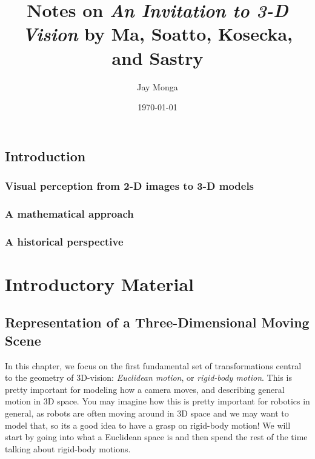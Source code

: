 \documentclass{book}
\begin{document}
\title{Notes on \textit{An Invitation to 3-D Vision} by Ma, Soatto, Kosecka, and Sastry}
\author{Jay Monga}
\date{\today}
\maketitle

\tableofcontents

\chapter{Introduction}

\section{Visual perception from 2-D images to 3-D models}

\section{A mathematical approach}

\section{A historical perspective}

\part{Introductory Material}

\chapter{Representation of a Three-Dimensional Moving Scene}

In this chapter, we focus on the first fundamental set of transformations central to the geometry of 3D-vision: \textit{Euclidean motion}, or \textit{rigid-body motion}.
This is pretty important for modeling how a camera moves, and describing general motion in 3D space.
You may imagine how this is pretty important for robotics in general, as robots are often moving around in 3D space and we may want to model that, so its a good idea to have a grasp on rigid-body motion!
We will start by going into what a Euclidean space is and then spend the rest of the time talking about rigid-body motions.
\end{document}

